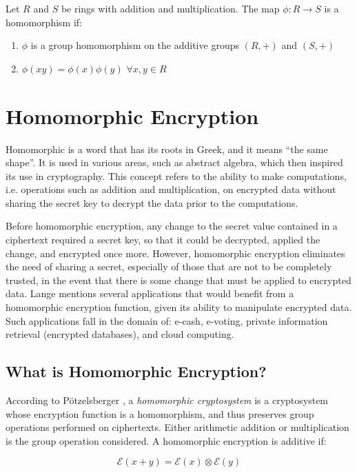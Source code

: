 Let $R$ and $S$ be rings with addition and multiplication. The map $\phi: R \rightarrow S$ is a homomorphism if:
\begin{enumerate}
\item $\phi$ is a group homomorphism on the additive groups $(R, +)$ and $(S,+)$
\item $\phi(xy) = \phi(x) \phi(y)$ $\forall x, y \in R$
\end{enumerate}

\section{Homomorphic Encryption}

Homomorphic is a word that has its roots in Greek, and it means ``the same shape''. It is used in various areas, such as abstract algebra, which then inspired its use in cryptography. This concept refers to the ability to make computations, i.e. operations such as addition and multiplication, on encrypted data without sharing the secret key to decrypt the data prior to the computations. 

Before homomorphic encryption, any change to the secret value contained in a ciphertext required a secret key, so that it could be decrypted, applied the change, and encrypted once more. However, homomorphic encryption eliminates the need of sharing a secret, especially of those that are not to be completely trusted, in the event that there is some change that must be applied to encrypted data. 
Lange \cite{langue2011} mentions several applications that would benefit from a homomorphic encryption function, given its ability to manipulate encrypted data. Such applications fall in the domain of: e-cash, e-voting, private information retrieval (encrypted databases), and cloud computing.

\subsection{What is Homomorphic Encryption?}

According to P{\"o}tzelsberger \cite{potzelsberger2013kv}, a \textit{homomorphic cryptosystem} is a cryptosystem whose encryption function is a homomorphism, and thus preserves group operations performed on ciphertexts. Either arithmetic addition or multiplication is the group operation considered.  A homomorphic encryption is additive if:

\begin{equation}
\mathcal{E}(x+y) = \mathcal{E}(x)\otimes \mathcal{E}(y)
\end{equation}

